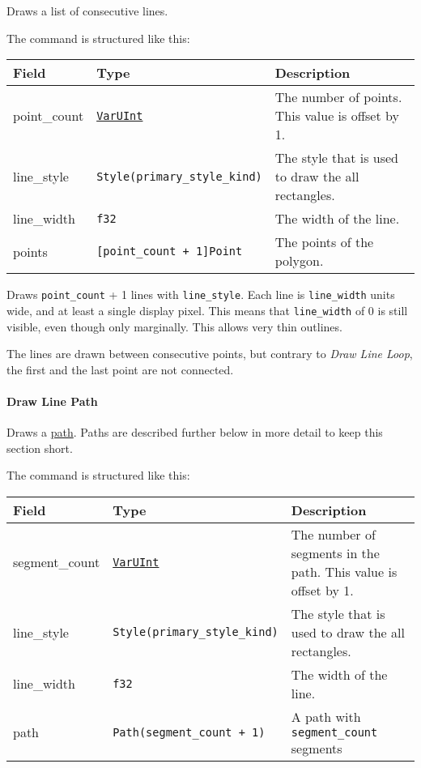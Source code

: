 \documentclass[]{article}
\begin{document}
Draws a list of consecutive lines.

The command is structured like this:

\begin{longtable}[]{@{}lll@{}}
\toprule
Field & Type & Description \\
\midrule
\endhead
point\_count & \protect\hyperlink{varuint}{\texttt{VarUInt}} & The
number of points. This value is offset by 1. \\
line\_style & \texttt{Style(primary\_style\_kind)} & The style that is
used to draw the all rectangles. \\
line\_width & \texttt{f32} & The width of the line. \\
points & \texttt{{[}point\_count\ +\ 1{]}Point} & The points of the
polygon. \\
\bottomrule
\end{longtable}

Draws \texttt{point\_count} + 1 lines with \texttt{line\_style}. Each
line is \texttt{line\_width} units wide, and at least a single display
pixel. This means that \texttt{line\_width} of 0 is still visible, even
though only marginally. This allows very thin outlines.

The lines are drawn between consecutive points, but contrary to
\emph{Draw Line Loop}, the first and the last point are not connected.

\hypertarget{draw-line-path}{%
\paragraph{Draw Line Path}\label{draw-line-path}}

Draws a \protect\hyperlink{path}{path}. Paths are described further
below in more detail to keep this section short.

The command is structured like this:

\begin{longtable}[]{@{}lll@{}}
\toprule
Field & Type & Description \\
\midrule
\endhead
segment\_count & \protect\hyperlink{varuint}{\texttt{VarUInt}} & The
number of segments in the path. This value is offset by 1. \\
line\_style & \texttt{Style(primary\_style\_kind)} & The style that is
used to draw the all rectangles. \\
line\_width & \texttt{f32} & The width of the line. \\
path & \texttt{Path(segment\_count\ +\ 1)} & A path with
\texttt{segment\_count} segments \\
\bottomrule
\end{longtable}
\end{document}
